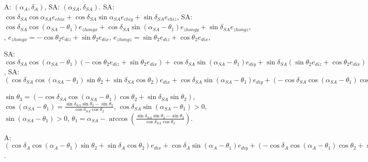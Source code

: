 \documentclass[a4paper,12pt]{article}
\theoremstyle{definition}
\begin{document}
A: $(\alpha_A, \delta_A)$, SA: $(\alpha_{SA}, \delta_{SA})$.
SA: $\cos\delta_{SA}\cos\alpha_{SA}e_{chix}+\cos\delta_{SA}\sin\alpha_{SA}e_{chiy}+\sin\delta_{SA}e_{chiz}$, SA: $\cos\delta_{SA}\cos(\alpha_{SA}-{\theta_1})e_{zhongx}+\cos\delta_{SA}\sin(\alpha_{SA}-{\theta_1})e_{zhongy}+\sin\delta_{SA}e_{zhongz}$, , $e_{zhongx}=-\cos{\theta_2}e_{diz}+\sin{\theta_2}e_{dix}$, $e_{zhongz}=\sin{\theta_2}e_{diz}+\cos{\theta_2}e_{dix}$,

SA: $\cos\delta_{SA}\cos(\alpha_{SA}-{\theta_1})(-\cos{\theta_2}e_{diz}+\sin{\theta_2}e_{dix})+\cos\delta_{SA}\sin(\alpha_{SA}-{\theta_1})e_{diy}+\sin\delta_{SA}(\sin{\theta_2}e_{diz}+\cos{\theta_2}e_{dix})$, SA: $(\cos\delta_{SA}\cos(\alpha_{SA}-{\theta_1})\sin{\theta_2}+\sin\delta_{SA}\cos{\theta_2})e_{dix}+\cos\delta_{SA}\sin(\alpha_{SA}-{\theta_1})e_{diy}+(-\cos\delta_{SA}\cos(\alpha_{SA}-{\theta_1})\cos{\theta_2}+\sin\delta_{SA}\sin{\theta_2})e_{diz}$

$\sin\theta_3=(-\cos\delta_{SA}\cos(\alpha_{SA}-{\theta_1})\cos{\theta_2}+\sin\delta_{SA}\sin{\theta_2})$, $\cos(\alpha_{SA}-{\theta_1})=\frac{\sin\delta_{SA}\sin{\theta_2}-\sin\theta_3}{\cos\delta_{SA}\cos{\theta_2}}$, $\cos\delta_{SA}\sin(\alpha_{SA}-{\theta_1})>0$, $\sin(\alpha_{SA}-{\theta_1})>0$, $\theta_1=\alpha_{SA}-\arccos(\frac{\sin\delta_{SA}\sin{\theta_2}-\sin\theta_3}{\cos\delta_{SA}\cos{\theta_2}})$.

A: $(\cos\delta_A\cos(\alpha_A-{\theta_1})\sin{\theta_2}+\sin\delta_A\cos{\theta_2})e_{dix}+\cos\delta_A\sin(\alpha_A-{\theta_1})e_{diy}+(-\cos\delta_A\cos(\alpha_A-{\theta_1})\cos{\theta_2}+\sin\delta_A\sin{\theta_2})e_{diz}$.
\end{document}
